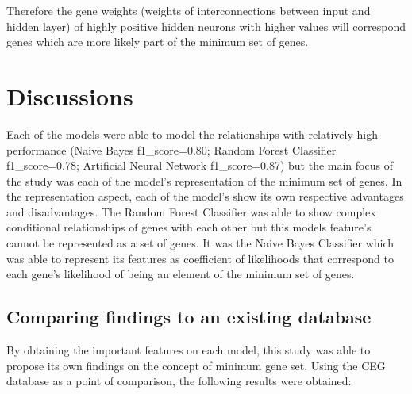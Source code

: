 \documentclass[]{report}
\begin{document}
Therefore the gene weights (weights of interconnections between input
and hidden layer) of highly positive hidden neurons with higher values
will correspond genes which are more likely part of the minimum set of
genes.

\chapter{Discussions}\label{discussions}

Each of the models were able to model the relationships with relatively
high performance (Naive Bayes f1\_score=0.80; Random Forest Classifier
f1\_score=0.78; Artificial Neural Network f1\_score=0.87) but the main
focus of the study was each of the model's representation of the minimum
set of genes. In the representation aspect, each of the model's show its
own respective advantages and disadvantages. The Random Forest
Classifier was able to show complex conditional relationships of genes
with each other but this models feature's cannot be represented as a set
of genes. It was the Naive Bayes Classifier which was able to represent
its features as coefficient of likelihoods that correspond to each
gene's likelihood of being an element of the minimum set of genes.

\section{Comparing findings to an existing
database}\label{comparing-findings-to-an-existing-database}

By obtaining the important features on each model, this study was able
to propose its own findings on the concept of minimum gene set. Using
the CEG database as a point of comparison, the following results were
obtained:
\end{document}
